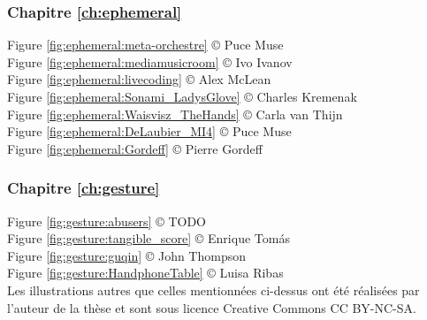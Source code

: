 %
\label{sec:credits}

\subsubsection*{Chapitre \ref{ch:ephemeral}}
\noindent Figure \ref{fig:ephemeral:meta-orchestre} © Puce Muse\\
Figure \ref{fig:ephemeral:mediamusicroom} © Ivo Ivanov\\
Figure \ref{fig:ephemeral:livecoding} © Alex McLean\\
Figure \ref{fig:ephemeral:Sonami_LadysGlove} © Charles Kremenak\\
Figure \ref{fig:ephemeral:Waisvisz_TheHands} © Carla van Thijn\\
Figure \ref{fig:ephemeral:DeLaubier_MI4} © Puce Muse\\
Figure \ref{fig:ephemeral:Gordeff} © Pierre Gordeff\\

\subsubsection*{Chapitre \ref{ch:gesture}}
\noindent Figure \ref{fig:gesture:abusers} © TODO\\
Figure \ref{fig:gesture:tangible_score} © Enrique Tomás\\
Figure \ref{fig:gesture:guqin} © John Thompson\\
Figure \ref{fig:gesture:HandphoneTable} © Luisa Ribas\\

\noindent Les illustrations autres que celles mentionnées ci-dessus ont été réalisées par l'auteur de la thèse et sont sous licence Creative Commons CC BY-NC-SA.



